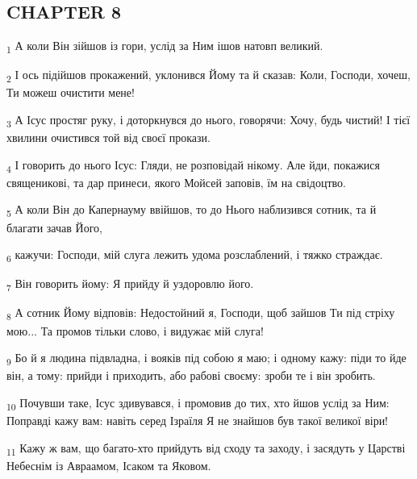 \subsection{CHAPTER 8}
\begin{tcolorbox}
\textsubscript{1} А коли Він зійшов із гори, услід за Ним ішов натовп великий.
\end{tcolorbox}
\begin{tcolorbox}
\textsubscript{2} І ось підійшов прокажений, уклонився Йому та й сказав: Коли, Господи, хочеш, Ти можеш очистити мене!
\end{tcolorbox}
\begin{tcolorbox}
\textsubscript{3} А Ісус простяг руку, і доторкнувся до нього, говорячи: Хочу, будь чистий! І тієї хвилини очистився той від своєї прокази.
\end{tcolorbox}
\begin{tcolorbox}
\textsubscript{4} І говорить до нього Ісус: Гляди, не розповідай нікому. Але йди, покажися священикові, та дар принеси, якого Мойсей заповів, їм на свідоцтво.
\end{tcolorbox}
\begin{tcolorbox}
\textsubscript{5} А коли Він до Капернауму ввійшов, то до Нього наблизився сотник, та й благати зачав Його,
\end{tcolorbox}
\begin{tcolorbox}
\textsubscript{6} кажучи: Господи, мій слуга лежить удома розслаблений, і тяжко страждає.
\end{tcolorbox}
\begin{tcolorbox}
\textsubscript{7} Він говорить йому: Я прийду й уздоровлю його.
\end{tcolorbox}
\begin{tcolorbox}
\textsubscript{8} А сотник Йому відповів: Недостойний я, Господи, щоб зайшов Ти під стріху мою... Та промов тільки слово, і видужає мій слуга!
\end{tcolorbox}
\begin{tcolorbox}
\textsubscript{9} Бо й я людина підвладна, і вояків під собою я маю; і одному кажу: піди то йде він, а тому: прийди і приходить, або рабові своєму: зроби те і він зробить.
\end{tcolorbox}
\begin{tcolorbox}
\textsubscript{10} Почувши таке, Ісус здивувався, і промовив до тих, хто йшов услід за Ним: Поправді кажу вам: навіть серед Ізраїля Я не знайшов був такої великої віри!
\end{tcolorbox}
\begin{tcolorbox}
\textsubscript{11} Кажу ж вам, що багато-хто прийдуть від сходу та заходу, і засядуть у Царстві Небеснім із Авраамом, Ісаком та Яковом.
\end{tcolorbox}
